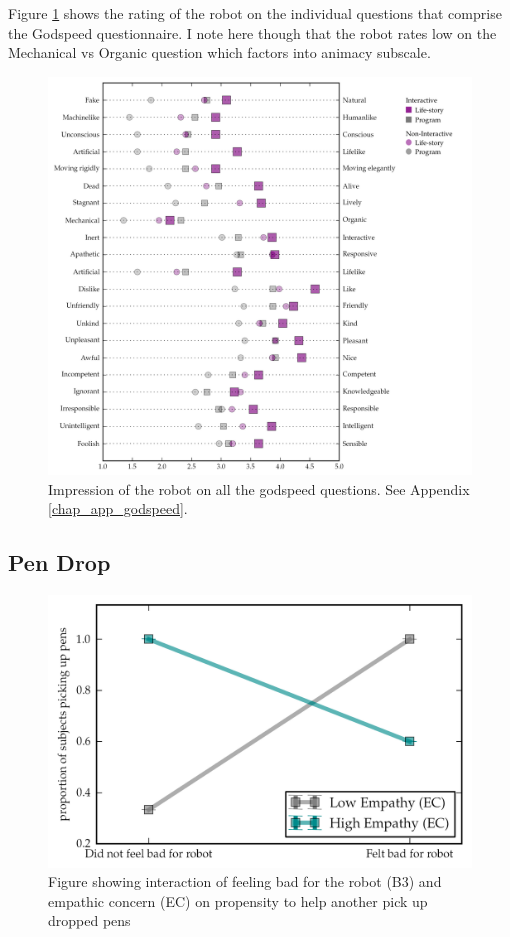 Figure \ref{fig_study_godspeed_madness} shows the rating of the robot on the individual questions that comprise the Godspeed questionnaire. I note here though that the robot rates low on the Mechanical vs Organic question which factors into animacy subscale. 


   \begin{figure}[thpb]
      \centering
      \includegraphics[width=6in]{figures/study/rev2/godspeed/godspeed_madness_legend.png}
      \caption{Impression of the robot on all the godspeed questions. See Appendix \ref{chap_app_godspeed}.}
      \label{fig_study_godspeed_madness}
   \end{figure}


\subsection{Pen Drop}


   \begin{figure}[thpb]
      \centering
      \includegraphics[width=4.6in]{figures/study/rev2/pen/ec_prop.png}
      \caption{Figure showing interaction of feeling bad for the robot (B3) and empathic concern (EC) on propensity to help another pick up dropped pens}
      \label{fig_study_ec_prop}
   \end{figure}


